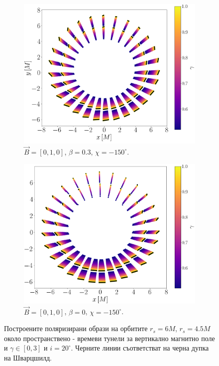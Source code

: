 \begin{figure}[!htb]
	\centering
	\begin{subfigure}{7cm}
		\includegraphics[scale = 0.2]{JNW_alpha_Vert_Field.png}
		\caption{$\vec{B} = [0, 1, 0]$, $\beta = 0.3$, $\chi = -150^\circ$.} 
	\end{subfigure}
	\begin{subfigure}{7cm}
		\hspace{1cm}
		\includegraphics[scale = 0.2]{JNW_alpha_Vert_Field_beta_zero.png}
		\caption{$\vec{B} = [0, 1, 0]$, $\beta = 0$, $\chi = -150^\circ$.}
	\end{subfigure}
	\caption[Поляризирани образи около пространствено - времеви тунели за вертикално магнитно поле.]{\small Построените поляризирани образи на орбитите $r_s = 6M$, $r_s = 4.5M$ около пространствено - времеви тунели за вертикално магнитно поле и $\gamma \in[0,3]$ и $i = 20^\circ$. Черните линии съответстват на черна дупка на Шварцшилд.} 
	\label{JNW_pol_vert_field}
\end{figure}

